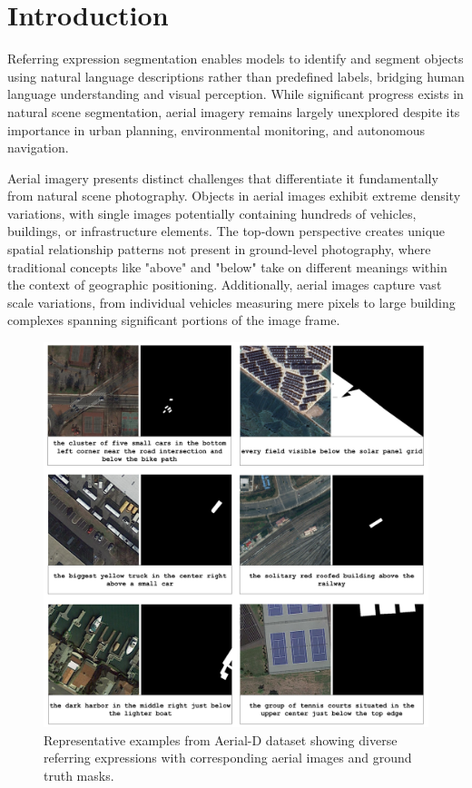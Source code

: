 
\section{Introduction}
\label{sec:intro}

Referring expression segmentation enables models to identify and segment objects using natural language descriptions rather than predefined labels, bridging human language understanding and visual perception. While significant progress exists in natural scene segmentation, aerial imagery remains largely unexplored despite its importance in urban planning, environmental monitoring, and autonomous navigation.

Aerial imagery presents distinct challenges that differentiate it fundamentally from natural scene photography. Objects in aerial images exhibit extreme density variations, with single images potentially containing hundreds of vehicles, buildings, or infrastructure elements. The top-down perspective creates unique spatial relationship patterns not present in ground-level photography, where traditional concepts like "above" and "below" take on different meanings within the context of geographic positioning. Additionally, aerial images capture vast scale variations, from individual vehicles measuring mere pixels to large building complexes spanning significant portions of the image frame.

\begin{figure}[H]
\centering
\includegraphics[width=\columnwidth]{./images/6samples.png}
\caption{Representative examples from Aerial-D dataset showing diverse referring expressions with corresponding aerial images and ground truth masks.}
\label{fig:dataset_examples}
\end{figure}

